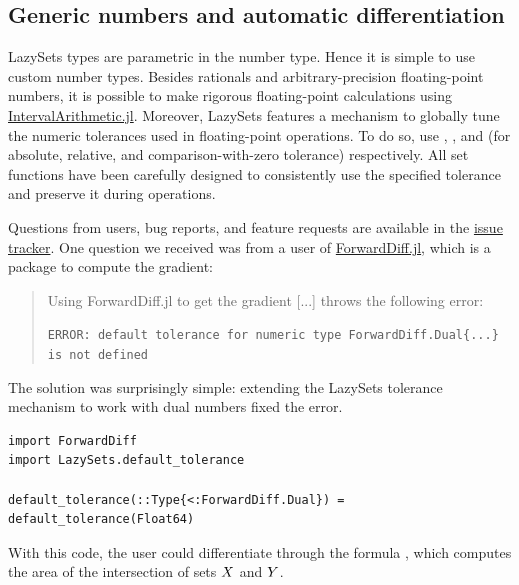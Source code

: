 \subsection{Generic numbers and automatic differentiation}\label{sec:numbertypes}

LazySets types are parametric in the number type. Hence it is simple to use custom number types.
%
Besides rationals and arbitrary-precision floating-point numbers, it is possible to make rigorous floating-point calculations using \href{https://github.com/JuliaIntervals/IntervalArithmetic.jl}{IntervalArithmetic.jl}.
%
Moreover, LazySets features a mechanism to globally tune the numeric tolerances used in floating-point operations.
%
To do so, use , , and  (for absolute, relative, and comparison-with-zero tolerance) respectively.
%
All set functions have been carefully designed to consistently use the specified tolerance and preserve it during operations.

\smallskip

Questions from users, bug reports, and feature requests are available in the \href{https://github.com/JuliaReach/LazySets.jl/issues/}{issue tracker}.
%
One question we received was from a user of \href{https://github.com/JuliaDiff/ForwardDiff.jl}{ForwardDiff.jl}, which is a package to compute the gradient:

\begin{quote}
	Using ForwardDiff.jl to get the gradient [...] throws the following error:

\texttt{ERROR: default tolerance for numeric type ForwardDiff.Dual\{...\} is not defined}
\end{quote}

The solution was surprisingly simple: extending the LazySets tolerance mechanism to work with dual numbers fixed the error.

\begin{minipage}{\linewidth}
	\vspace{-\abovedisplayskip}
	\begin{lstlisting}
import ForwardDiff
import LazySets.default_tolerance

default_tolerance(::Type{<:ForwardDiff.Dual}) = default_tolerance(Float64)
	\end{lstlisting}
\end{minipage}
With this code, the user could differentiate through the formula , which computes the area of the intersection of sets $X$ and $Y$.


